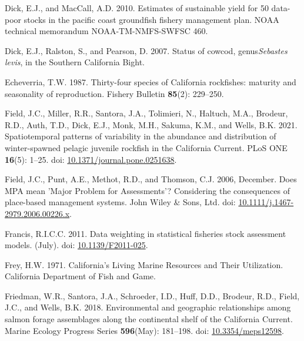 \documentclass[
  english,
  a4paper,
]{article}
\newlength{\cslhangindent}
\newlength{\cslentryspacingunit} %
\newenvironment{CSLReferences}[2] %
 {%
  \setlength{\parindent}{0pt}
  \ifodd #1
  \let\oldpar\par
  \def\par{\hangindent=\cslhangindent\oldpar}
  \fi
  \setlength{\parskip}{#2\cslentryspacingunit}
 }%
 {}
\begin{document}
\begin{CSLReferences}{1}{0}
\leavevmode{}%
Dick, E.J., and MacCall, A.D. 2010. {Estimates of sustainable yield for 50 data-poor stocks in the pacific coast groundfish fishery management plan}. NOAA technical memorandum NOAA-TM-NMFS-SWFSC 460.

\leavevmode{}%
Dick, E.J., Ralston, S., and Pearson, D. 2007. {Status of cowcod, genus\emph{Sebastes levis}, in the Southern California Bight}.

\leavevmode{}%
Echeverria, T.W. 1987. {Thirty-four species of California rockfishes: maturity and seasonality of reproduction}. Fishery Bulletin \textbf{85}(2): 229--250.

\leavevmode{}%
Field, J.C., Miller, R.R., Santora, J.A., Tolimieri, N., Haltuch, M.A., Brodeur, R.D., Auth, T.D., Dick, E.J., Monk, M.H., Sakuma, K.M., and Wells, B.K. 2021. {Spatiotemporal patterns of variability in the abundance and distribution of winter-spawned pelagic juvenile rockfish in the California Current}. PLoS ONE \textbf{16}(5): 1--25. doi: \href{https://doi.org/10.1371/journal.pone.0251638}{10.1371/journal.pone.0251638}.

\leavevmode{}%
Field, J.C., Punt, A.E., Methot, R.D., and Thomson, C.J. 2006, December. {Does MPA mean 'Major Problem for Assessments'? Considering the consequences of place-based management systems}. John Wiley \& Sons, Ltd. doi: \href{https://doi.org/10.1111/j.1467-2979.2006.00226.x}{10.1111/j.1467-2979.2006.00226.x}.

\leavevmode{}%
Francis, R.I.C.C. 2011. {Data weighting in statistical fisheries stock assessment models}. (July). doi: \href{https://doi.org/10.1139/F2011-025}{10.1139/F2011-025}.

\leavevmode{}%
Frey, H.W. 1971. {California's Living Marine Resources and Their Utilization. California Department of Fish and Game}.

\leavevmode{}%
Friedman, W.R., Santora, J.A., Schroeder, I.D., Huff, D.D., Brodeur, R.D., Field, J.C., and Wells, B.K. 2018. {Environmental and geographic relationships among salmon forage assemblages along the continental shelf of the California Current}. Marine Ecology Progress Series \textbf{596}(May): 181--198. doi: \href{https://doi.org/10.3354/meps12598}{10.3354/meps12598}.


\end{CSLReferences}
\end{document}
